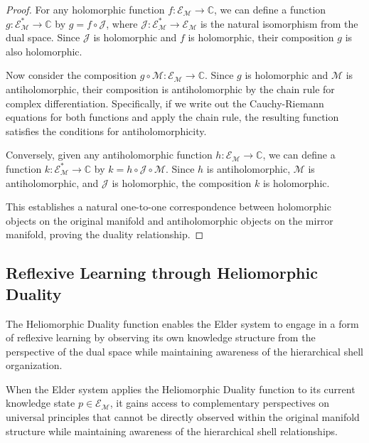 \begin{proof}
For any holomorphic function $f: \mathcal{E}_{\mathcal{M}} \rightarrow \mathbb{C}$, we can define a function $g: \mathcal{E}_{\mathcal{M}}^* \rightarrow \mathbb{C}$ by $g = f \circ \mathcal{J}$, where $\mathcal{J}: \mathcal{E}_{\mathcal{M}}^* \rightarrow \mathcal{E}_{\mathcal{M}}$ is the natural isomorphism from the dual space. Since $\mathcal{J}$ is holomorphic and $f$ is holomorphic, their composition $g$ is also holomorphic.

Now consider the composition $g \circ \mathcal{M}: \mathcal{E}_{\mathcal{M}} \rightarrow \mathbb{C}$. Since $g$ is holomorphic and $\mathcal{M}$ is antiholomorphic, their composition is antiholomorphic by the chain rule for complex differentiation. Specifically, if we write out the Cauchy-Riemann equations for both functions and apply the chain rule, the resulting function satisfies the conditions for antiholomorphicity.

Conversely, given any antiholomorphic function $h: \mathcal{E}_{\mathcal{M}} \rightarrow \mathbb{C}$, we can define a function $k: \mathcal{E}_{\mathcal{M}}^* \rightarrow \mathbb{C}$ by $k = h \circ \mathcal{J} \circ \mathcal{M}$. Since $h$ is antiholomorphic, $\mathcal{M}$ is antiholomorphic, and $\mathcal{J}$ is holomorphic, the composition $k$ is holomorphic.

This establishes a natural one-to-one correspondence between holomorphic objects on the original manifold and antiholomorphic objects on the mirror manifold, proving the duality relationship.
\end{proof}

\subsection{Reflexive Learning through Heliomorphic Duality}

The Heliomorphic Duality function enables the Elder system to engage in a form of reflexive learning by observing its own knowledge structure from the perspective of the dual space while maintaining awareness of the hierarchical shell organization.

\begin{theorem}
When the Elder system applies the Heliomorphic Duality function to its current knowledge state $p \in \mathcal{E}_{\mathcal{M}}$, it gains access to complementary perspectives on universal principles that cannot be directly observed within the original manifold structure while maintaining awareness of the hierarchical shell relationships.
\end{theorem}


